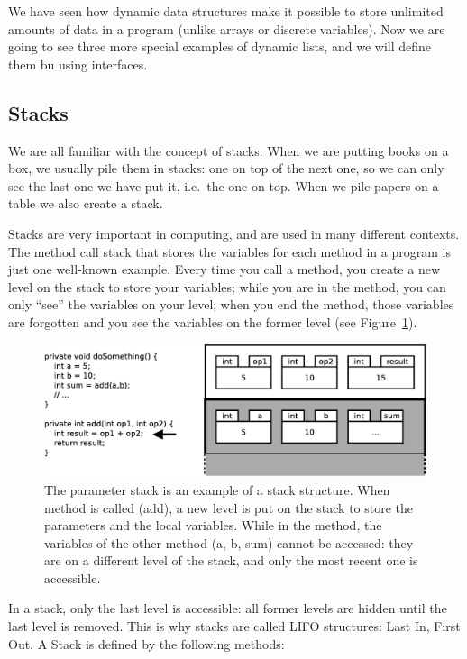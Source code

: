 We have seen how dynamic data structures make it possible to store
unlimited amounts of data in a program (unlike arrays or discrete
variables). Now we are going to see three more special examples of
dynamic lists, and we will define them bu using interfaces. 

\subsection{Stacks}
\label{sec:stacks}

We are all familiar with the concept of stacks. When we are putting
books on a box, we usually pile them in stacks: one on top of the
next one, so we can only see the last one we have put it, i.e.~the one
on top. When we pile papers on a table we also create a stack. 

Stacks are very important in computing, and are used in many different
contexts. The method call stack that stores the variables for each
method in a program is just one well-known example. Every time you
call a method, you create a new level on the stack to store your
variables; while you are in the method, you can only ``see'' the
variables on your level; when you end the method, those variables are
forgotten and you see the variables on the former level (see
Figure~\ref{fig:stackparameter}).  

\begin{figure}[hbtp]
  \centering
  \includegraphics[width=\textwidth]{gfx/parameter-stack}
  \caption{The parameter stack is an example of a stack
    structure. When method is called (add), a new level is put on the
    stack to store the parameters and the local variables. While in
    the method, the variables of the other method (a, b, sum) cannot
    be accessed: they are on a different level of the stack, and only
    the most recent one is accessible.}
  \label{fig:stackparameter}
\end{figure}

In a stack, only the last level is accessible: all former levels are
hidden until the last level is removed. This is why stacks are called
LIFO structures: Last In, First Out. A Stack is defined by the
following methods:  

